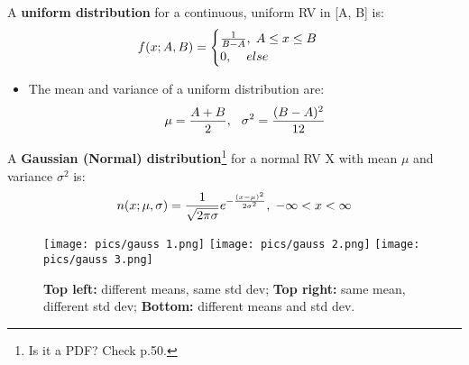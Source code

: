\documentclass[10pt, letterpaper, twoside]{article}
\begin{document}
\begin{multicols}{2}
A \textbf{uniform distribution} for a continuous, uniform RV in [A, B] is:
\begin{equation*}
    f(x;A,B) = \begin{cases}
        \frac{1}{B-A}, \hspace{0.1cm} A \leq x \leq B \\
        0, \hspace{0.4cm} else
    \end{cases}
\end{equation*}
\begin{itemize}
    \item The mean and variance of a uniform distribution are: 
    \begin{equation*}
        \mu = \frac{A + B}{2}, \hspace{0.25 cm} \sigma^2 = \frac{(B-A)^2}{12}
    \end{equation*}
\end{itemize}

A \textbf{Gaussian (Normal) distribution}\footnote[3]{Is it a PDF? Check p.50. } for a normal RV X with mean $\mu$ and variance $\sigma^2$ is:
\begin{equation*}
    n(x;\mu,\sigma) = \frac{1}{\sqrt{2\pi\sigma}}e^{-{\frac{(x-\mu)^2}{2\sigma^2}}}, \hspace{0.1cm} -\infty < x < \infty
\end{equation*}
\end{multicols}

\begin{figure}[!ht]
    \centering
    \texttt{[image: pics/gauss 1.png]} \texttt{[image: pics/gauss 2.png]}
    \texttt{[image: pics/gauss 3.png]}
    \caption{\textbf{Top left:} different means, same std dev; \textbf{Top right:} same mean, different std dev; \textbf{Bottom:} different means and std dev.}
    \label{fig:my_label}
\end{figure}
\end{document}
